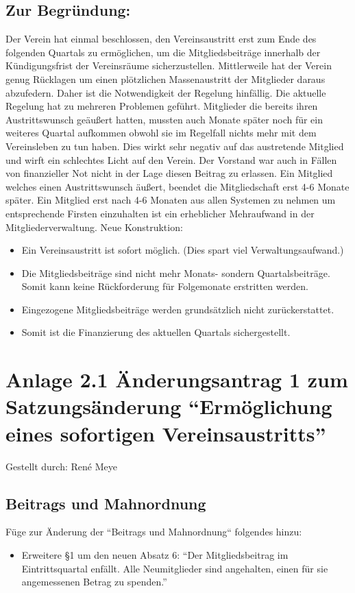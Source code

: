 \documentclass[a4paper,12pt,titlepage]{scrartcl}
\begin{document}
\subsection*{Zur Begründung:}
Der Verein hat einmal beschlossen, den Vereinsaustritt erst zum Ende des folgenden Quartals zu ermöglichen, um die Mitgliedsbeiträge innerhalb der Kündigungsfrist der Vereinsräume sicherzustellen.
Mittlerweile hat der Verein genug Rücklagen um einen plötzlichen Massenaustritt der Mitglieder daraus abzufedern. Daher ist die Notwendigkeit der Regelung hinfällig.
Die aktuelle Regelung hat zu mehreren Problemen geführt. Mitglieder die bereits ihren Austrittswunsch geäußert hatten, mussten auch Monate später noch für ein weiteres Quartal aufkommen obwohl sie im Regelfall nichts mehr mit dem Vereinsleben zu tun haben. Dies wirkt sehr negativ auf das austretende Mitglied und wirft ein schlechtes Licht auf den Verein. Der Vorstand war auch in Fällen von finanzieller Not nicht in der Lage diesen Beitrag zu erlassen.
Ein Mitglied welches einen Austrittswunsch äußert, beendet die Mitgliedschaft erst 4-6 Monate später. Ein Mitglied erst nach 4-6 Monaten aus allen Systemen zu nehmen um entsprechende Firsten einzuhalten ist ein erheblicher Mehraufwand in der Mitgliederverwaltung.
Neue Konstruktion:
\begin{itemize}
	\item Ein Vereinsaustritt ist sofort möglich. (Dies spart viel Verwaltungsaufwand.)
	\item Die Mitgliedsbeiträge sind nicht mehr Monats- sondern Quartalsbeiträge. Somit kann keine Rückforderung für Folgemonate erstritten werden.
	\item Eingezogene Mitgliedsbeiträge werden grundsätzlich nicht zurückerstattet.
	\item Somit ist die Finanzierung des aktuellen Quartals sichergestellt.
\end{itemize}	

\newpage

\section*{Anlage 2.1 Änderungsantrag 1 zum Satzungsänderung “Ermöglichung eines sofortigen Vereinsaustritts”}

Gestellt durch: René Meye

\subsection*{Beitrags und Mahnordnung}
Füge zur Änderung der “Beitrags und Mahnordnung“ folgendes hinzu:
\begin{itemize}
	\item Erweitere §1 um den neuen Absatz 6: “Der Mitgliedsbeitrag im Eintrittsquartal enfällt. Alle Neumitglieder sind angehalten, einen für sie angemessenen Betrag zu spenden.”
\end{itemize}	
\end{document}
